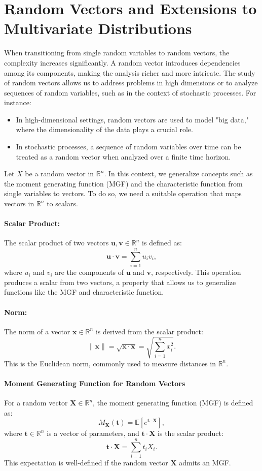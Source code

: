 \section{Random Vectors and Extensions to Multivariate Distributions}
When transitioning from single random variables to random vectors, the complexity increases significantly. A random vector introduces dependencies among its components, making the analysis richer and more intricate. The study of random vectors allows us to address problems in high dimensions or to analyze sequences of random variables, such as in the context of stochastic processes. \newline
For instance:
\begin{itemize}
    \item In high-dimensional settings, random vectors are used to model "big data," where the dimensionality of the data plays a crucial role.
    \item In stochastic processes, a sequence of random variables over time can be treated as a random vector when analyzed over a finite time horizon.
\end{itemize}
Let \( X \) be a random vector in \( \mathbb{R}^n \). In this context, we generalize concepts such as the moment generating function (MGF) and the characteristic function from single variables to vectors. To do so, we need a suitable operation that maps vectors in \( \mathbb{R}^n \) to scalars. 
\paragraph{Scalar Product:}
The scalar product of two vectors \( \mathbf{u}, \mathbf{v} \in \mathbb{R}^n \) is defined as:
\[
\mathbf{u} \cdot \mathbf{v} = \sum_{i=1}^n u_i v_i,
\]
where \( u_i \) and \( v_i \) are the components of \( \mathbf{u} \) and \( \mathbf{v} \), respectively. This operation produces a scalar from two vectors, a property that allows us to generalize functions like the MGF and characteristic function. 
\paragraph{Norm:}
The norm of a vector \( \mathbf{x} \in \mathbb{R}^n \) is derived from the scalar product:
\[
\|\mathbf{x}\| = \sqrt{\mathbf{x} \cdot \mathbf{x}} = \sqrt{\sum_{i=1}^n x_i^2}.
\]
This is the Euclidean norm, commonly used to measure distances in \( \mathbb{R}^n \).

\paragraph{Moment Generating Function for Random Vectors}
For a random vector \( \mathbf{X} \in \mathbb{R}^n \), the moment generating function (MGF) is defined as:
\[
M_{\mathbf{X}}(\mathbf{t}) = \mathbb{E}\left[e^{\mathbf{t} \cdot \mathbf{X}}\right],
\]
where \( \mathbf{t} \in \mathbb{R}^n \) is a vector of parameters, and \( \mathbf{t} \cdot \mathbf{X} \) is the scalar product:
\[
\mathbf{t} \cdot \mathbf{X} = \sum_{i=1}^n t_i X_i.
\]
This expectation is well-defined if the random vector \( \mathbf{X} \) admits an MGF.

